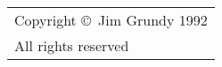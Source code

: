 \vfill
\begin{center}
    \begin{tabular}{l}
	Copyright \copyright\ Jim Grundy 1992	\\
	All rights reserved
    \end{tabular}
\end{center}
\newpage

